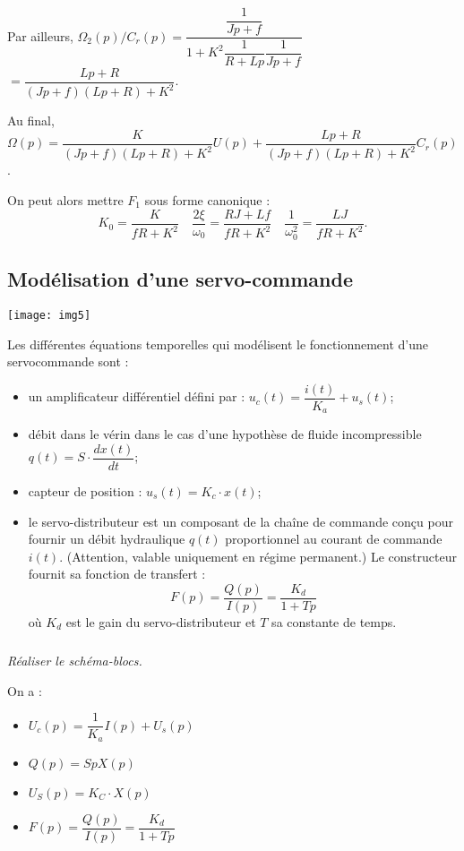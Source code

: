 \begin{multicols}{2}
\begin{corrige}
Par ailleurs, $\Omega_2(p)/C_r(p)=\dfrac{\dfrac{1}{Jp+f}}{1+K^2\dfrac{1}{R+Lp}\dfrac{1}{Jp+f}}$
$=\dfrac{Lp+R}{\left(Jp+f\right)\left(Lp+R\right)+K^2}$.


Au final, $\Omega(p)=\dfrac{K}{\left(Jp+f\right)\left(Lp+R\right)+K^2} U(p) + \dfrac{Lp+R}{\left(Jp+f\right)\left(Lp+R\right)+K^2} C_r(p)$. 

On peut alors mettre $F_1$ sous forme canonique : 
$$
K_0 =\dfrac{K}{fR+K^2}
\quad 
\dfrac{2\xi}{\omega_0} = \dfrac{RJ+Lf}{fR+K^2}
\quad
\dfrac{1}{\omega_0^2} =  \dfrac{LJ}{fR+K^2}.
$$
\end{corrige}
\else
\fi


\subsection*{Modélisation d'une servo-commande}

\setcounter{exo}{0}
\begin{center}
\texttt{[image: img5]}
\end{center}

Les différentes équations temporelles qui modélisent le fonctionnement d'une servocommande sont :
\begin{itemize}
\item un amplificateur différentiel défini par : $u_c(t)=\dfrac{i(t)}{K_a}+u_s(t)$;
\item débit dans le vérin dans le cas d'une hypothèse de fluide incompressible $q(t)=S\cdot\dfrac{dx(t)}{dt}$;
\item capteur de position : $u_s(t)=K_c\cdot x(t)$;
\item le servo-distributeur est un composant de la chaîne de commande conçu pour fournir un débit hydraulique $q(t)$ proportionnel au courant de commande $i(t)$. (Attention, valable uniquement en régime permanent.) Le constructeur fournit sa fonction de transfert :
$$
F(p)=\dfrac{Q(p)}{I(p)}=\dfrac{K_d}{1+Tp}
$$
où $K_d$ est le gain du servo-distributeur et $T$ sa constante de temps.
\end{itemize}

\subparagraph{}
\textit{Réaliser le schéma-blocs.}
\ifprof
\begin{corrige}
On a :
\begin{itemize}
\item $U_c(p)=\dfrac{1}{K_a}I(p)+U_s(p)$
\item $Q(p)=SpX(p)$
\item $U_S(p)=K_C\cdot X(p)$
\item $F(p)=\dfrac{Q(p)}{I(p)}=\dfrac{K_d}{1+Tp}$
\end{itemize}



\end{corrige}
\end{multicols}
